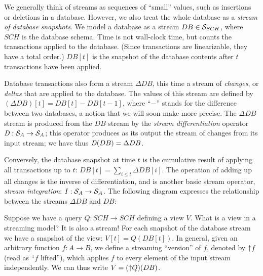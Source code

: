 We generally think of streams as sequences of ``small'' values,
such as insertions or deletions in a database.
However, we also treat the whole database as a \emph{stream of database
snapshots}.  We model a database as a
stream $DB \in \mathcal{S}_{SCH}$, where $SCH$ is the database schema.
Time is not wall-clock time, but counts
the transactions applied to the database.
(Since transactions are linearizable, they have a total order.)
$DB[t]$ is the snapshot of the
database contents after $t$ transactions have been applied.

Database transactions also form a stream $\Delta DB$, this time a stream of \emph{changes},
or \emph{deltas} that are applied to the database.  The values of
this stream are defined by $(\Delta DB)[t] = DB[t] - DB[t-1]$, where ``$-$'' stands
for the difference between two databases, a notion that we will soon make more precise.
The $\Delta DB$ stream is produced from the $DB$ stream by
the \emph{stream differentiation} operator $\mathit{D} : \mathcal{S}_{A} \to \mathcal{S}_{A}$;
this operator produces as its output the stream of changes from its input stream;
we have thus $\mathit{D}(DB) = \Delta DB$.

Conversely, the database snapshot at time $t$ is the cumulative result of applying all
transactions up to $t$: $DB[t] = \sum_{i \leq t} \Delta DB[i]$.
The operation of adding up all changes is the inverse of differentiation,
and is another basic stream operator, \emph{stream integration}: $\mathit{I}: \mathcal{S}_{A} \to \mathcal{S}_{A}$.
The following diagram expresses the relationship between the streams $\Delta DB$ and $DB$:

\begin{center}
\end{center}

Suppose we have a query $Q : SCH \to SCH$ defining a view $V$.  What is
a view in a streaming model?  It is also a stream!  For each snapshot
of the database stream we have a snapshot of the view: $V[t] = Q(DB[t])$.
In general, given an arbitrary function $f: A \to B$, we define
a streaming ``version'' of $f$, denoted by ${\uparrow}f$
(read as ``$f$ lifted''), which applies
$f$ to every element of the input stream independently.
We can thus write $V = ({\uparrow}Q)(DB)$.

